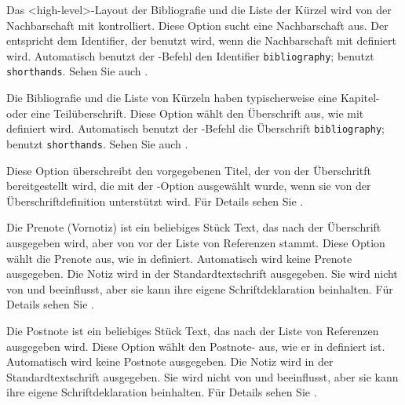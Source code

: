 \documentclass{ltxdockit}[2011/03/25]
\begin{document}
\begin{optionlist*}


Das <high-level>-Layout der Bibliografie und die Liste der Kürzel wird
von der Nachbarschaft mit  kontrolliert. Diese Option
sucht eine Nachbarschaft aus. Der  entspricht dem Identifier, der
benutzt wird, wenn die Nachbarschaft mit  definiert wird.
Automatisch benutzt der -Befehl den Identifier
\texttt{bibliography};  benutzt \texttt{shorthands}. Sehen Sie
auch .       


Die Bibliografie und die Liste von Kürzeln haben typischerweise eine
Kapitel- oder eine Teilüberschrift. Diese Option wählt den Überschrift 
aus, wie mit  definiert wird. Automatisch benutzt der
-Befehl die Überschrift \texttt{bibliography};
 benutzt \texttt{shorthands}. Sehen Sie auch
.    


Diese Option überschreibt den vorgegebenen Titel, der von der Überschritft
bereitgestellt wird, die mit der -Option ausgewählt wurde, wenn sie
von der Überschriftdefinition unterstützt wird. Für Details sehen Sie
.  


Die Prenote (Vornotiz) ist ein beliebiges Stück Text, das nach der Überschrift ausgegeben
wird, aber von vor der Liste von Referenzen stammt. Diese Option wählt die Prenote
 aus, wie in  definiert. Automatisch wird keine
Prenote ausgegeben. Die Notiz wird in der Standardtextschrift ausgegeben. Sie
wird nicht von  und  beeinflusst, aber sie kann ihre
eigene Schriftdeklaration beinhalten. Für Details sehen Sie .   


Die Postnote ist ein beliebiges Stück Text, das nach der Liste von Referenzen
ausgegeben wird. Diese Option wählt den Postnote- aus, wie er in
 definiert ist. Automatisch wird keine Postnote ausgegeben. Die
Notiz wird in der Standardtextschrift ausgegeben. Sie wird nicht von
 und  beeinflusst, aber sie kann ihre eigene
Schriftdeklaration beinhalten. Für Details sehen Sie . 


\end{optionlist*}
\end{document}
